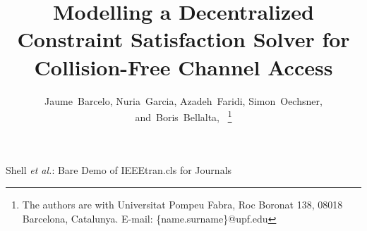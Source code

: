 \documentclass[journal]{IEEEtran}
\begin{document}
%
\title{Modelling a Decentralized Constraint Satisfaction Solver for Collision-Free Channel Access}
%
%
%

\author{Jaume~Barcelo, %
        Nuria~Garcia, %
        Azadeh~Faridi, 
        Simon~Oechsner, %
        and~Boris~Bellalta,~%
\thanks{The authors are with Universitat Pompeu Fabra,
Roc Boronat 138, 08018 Barcelona, Catalunya.
E-mail: \{name.surname\}@upf.edu
}
}

%
%



%
{Shell \MakeLowercase{\textit{et al.}}: Bare Demo of IEEEtran.cls for Journals}
%
\end{document}
